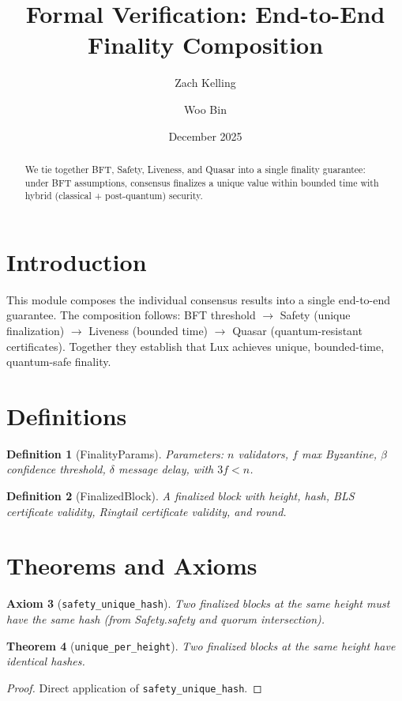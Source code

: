 \documentclass[11pt]{article}
\title{Formal Verification: End-to-End Finality Composition}
\author{Zach Kelling \and Woo Bin}
\date{December 2025}
\newtheorem{theorem}{Theorem}
\newtheorem{definition}[theorem]{Definition}
\newtheorem{axiom_stmt}[theorem]{Axiom}
\begin{document}
\maketitle

\begin{abstract}
We tie together BFT, Safety, Liveness, and Quasar into a single finality guarantee: under BFT assumptions, consensus finalizes a unique value within bounded time with hybrid (classical + post-quantum) security.
\end{abstract}

\section{Introduction}
This module composes the individual consensus results into a single end-to-end guarantee. The composition follows: BFT threshold $\to$ Safety (unique finalization) $\to$ Liveness (bounded time) $\to$ Quasar (quantum-resistant certificates). Together they establish that Lux achieves unique, bounded-time, quantum-safe finality.

\section{Definitions}
\begin{definition}[FinalityParams]
Parameters: $n$ validators, $f$ max Byzantine, $\beta$ confidence threshold, $\delta$ message delay, with $3f < n$.
\end{definition}

\begin{definition}[FinalizedBlock]
A finalized block with height, hash, BLS certificate validity, Ringtail certificate validity, and round.
\end{definition}


\section{Theorems and Axioms}
\begin{axiom_stmt}[\texttt{safety\_unique\_hash}]
Two finalized blocks at the same height must have the same hash (from Safety.safety and quorum intersection).
\end{axiom_stmt}

\begin{theorem}[\texttt{unique\_per\_height}]
Two finalized blocks at the same height have identical hashes.
\end{theorem}
\begin{proof}
Direct application of \texttt{safety\_unique\_hash}.
\end{proof}
\end{document}
